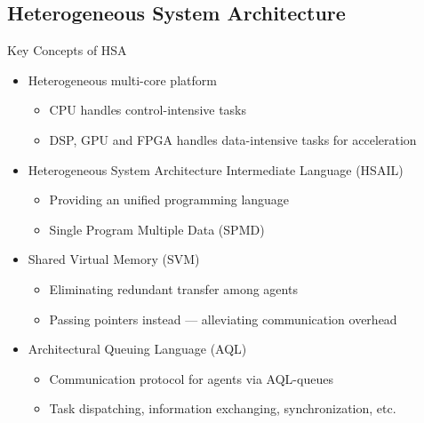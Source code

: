\documentclass{beamer}
\begin{document}
\begin{CJK}{UTF8}{bkai}
            \subsection{Heterogeneous System Architecture}
            \begin{frame}{Key Concepts of HSA}
                \begin{itemize}
                    \item <2->{Heterogeneous multi-core platform
                            \begin{itemize}
                                \item {
                                        CPU handles control-intensive tasks
                                    }
                                \item {
                                        DSP, GPU and FPGA handles data-intensive tasks for acceleration
                                    }
                            \end{itemize}
                        }
                    \item <3->{Heterogeneous System Architecture Intermediate Language (HSAIL)
                            \begin{itemize}
                                \item Providing an unified programming language %
                                \item Single Program Multiple Data (SPMD)
                            \end{itemize}
                        }
                    \item <4->{Shared Virtual Memory (SVM)
                            \begin{itemize}
                                \item Eliminating redundant transfer among agents
                                \item Passing pointers instead --- alleviating communication overhead
                            \end{itemize}
                        }
                    \item <5->{Architectural Queuing Language (AQL)
                            \begin{itemize}
                                \item Communication protocol for agents via AQL-queues
                                \item Task dispatching, information exchanging, synchronization, etc.
                            \end{itemize}
                        }
                \end{itemize} 
            \end{frame}


\end{CJK}
\end{document}
